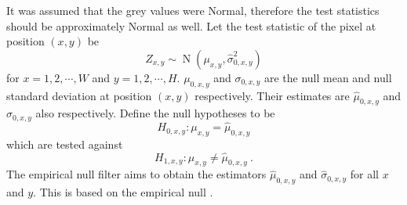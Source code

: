 \documentclass[twocolumn]{article}
\DeclareMathOperator{\normal}{N}
\begin{document}
It was assumed that the grey values were Normal, therefore the test statistics should be approximately Normal as well. Let the test statistic of the pixel at position $(x,y)$ be
\begin{equation}
Z_{x,y}\sim\normal(\mu_{x,y},\widehat{\sigma}_{0,x,y}^2)
\end{equation}
for $x=1,2,\cdots,W$ and $y=1,2,\cdots,H$. $\mu_{0,x,y}$ and $\sigma_{0,x,y}$ are the null mean and null standard deviation at position $(x,y)$ respectively. Their estimates are $\widehat{\mu}_{0,x,y}$ and $\widehat{\sigma}_{0,x,y}$ also respectively. Define the null hypotheses to be
\begin{equation}
  H_{0,x,y}:\mu_{x,y}=\widehat{\mu}_{0,x,y}
\end{equation}
which are tested against
\begin{equation}
  H_{1,x,y}:\mu_{x,y}\neq\widehat{\mu}_{0,x,y} \ .
\end{equation}
The empirical null filter aims to obtain the estimators $\widehat{\mu}
_{0,x,y}$ and $\widehat{\sigma}_{0,x,y}$ for all $x$ and $y$. This is based on the empirical null \citep{efron2004large}.
\end{document}
